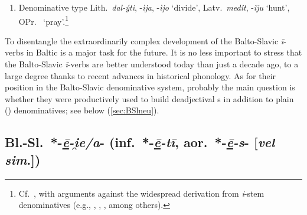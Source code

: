 \documentclass[output=paper,colorlinks,citecolor=brown]{langscibook}
\begin{document}
\begin{enumerate}
    \item Denominative type Lith.\ \textit{dal-ýti}, -\textit{ìja}, -\textit{ìjo} ‘divide’, Latv.\ \textit{medît}, -\textit{ĩju} ‘hunt’, OPr.\  ‘pray’.\footnote{Cf.\ \citet{VillanuevaSvensson2023b}, with arguments against the widespread derivation from \textit{i}-stem denominatives  (e.g., \citealt[367]{Stang1966}, \citealt[128]{Ostrowski2006}, \citealt[279--280]{Pakerys2011}, among others).}

\end{enumerate}

To disentangle the extraordinarily complex development of the Balto-Slavic \textit{ī}-verbs in Baltic is a major task for the future. It is no less important to stress that the Balto-Slavic \textit{ī}-verbs are better understood today than just a decade ago, to a large degree thanks to recent advances in historical phonology. As for their position in the Balto-Slavic denominative system, probably the main question is whether they were productively used to build deadjectival  s in addition to plain () denominatives; see below (\ref{sec:BSlneu}).

\subsection{Bl.-Sl.\ *-\textit{\underline{ē}-i̯e/a}- (inf.\ *-\textit{\underline{ē}-tī}, aor.\ *-\textit{\underline{ē}-s}- [\textit{vel sim}.])}
\label{sec:BSleje}
\end{document}
